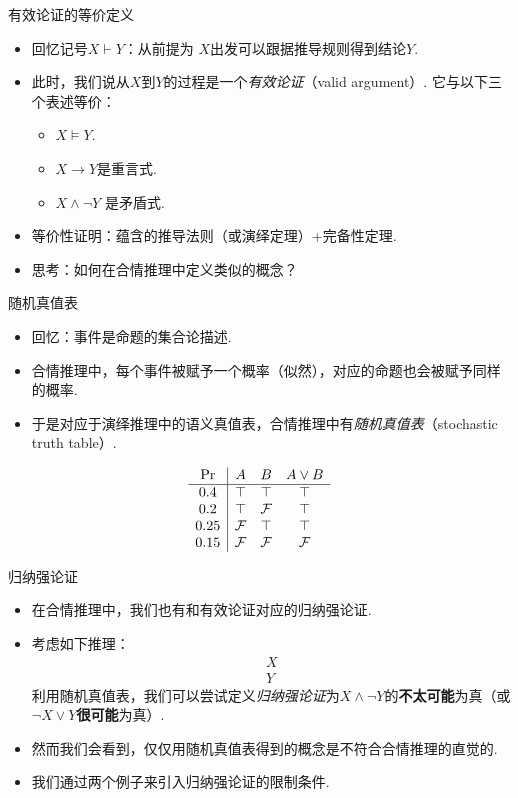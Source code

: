 {有效论证的等价定义}
\begin{itemize}
    \item 回忆记号$X\vdash Y$：从前提为 $X$出发可以跟据推导规则得到结论$Y$.
    \item 此时，我们说从$X$到$Y$的过程是一个\emph{有效论证}（valid argument）. 它与以下三个表述等价：
    \begin{itemize}
        \item $X\models Y$.
        \item  $X\to Y$是重言式.
        \item $X\wedge \lnot Y$ 是矛盾式.
    \end{itemize}
    \item 等价性证明：蕴含的推导法则（或演绎定理）+完备性定理.
    \item 思考：如何在合情推理中定义类似的概念？
 \end{itemize}



    {随机真值表}
    \begin{itemize}
        \item 回忆：事件是命题的集合论描述.
        \item 合情推理中，每个事件被赋予一个概率（似然），对应的命题也会被赋予同样的概率.
        \item 于是对应于演绎推理中的语义真值表，合情推理中有\emph{随机真值表}（stochastic truth table）.
    \end{itemize}
    \[
    \begin{array}{c|ccc}
        \Pr & A & B & A\vee B \\ \hline
        0.4 & \top & \top & \top \\ 
        0.2 & \top & \mathcal{F} & \top \\ 
        0.25 & \mathcal{F} & \top & \top \\
        0.15 & \mathcal{F} & \mathcal{F} & \mathcal{F} \\
    \end{array}\]



{归纳强论证}
	\begin{itemize}
	\item     在合情推理中，我们也有和有效论证对应的归纳强论证.
	\item 考虑如下推理：
	\[\begin{array}{c}
	     X\\\hline
	     Y
	\end{array}\]
	利用随机真值表，我们可以尝试定义\emph{归纳强论证}为$X\wedge\neg Y$的\textbf{不太可能}为真（或$\neg X\vee Y$\textbf{很可能}为真）.
	\item 然而我们会看到，仅仅用随机真值表得到的概念是不符合合情推理的直觉的.
	\item 我们通过两个例子来引入归纳强论证的限制条件.
	\end{itemize}



